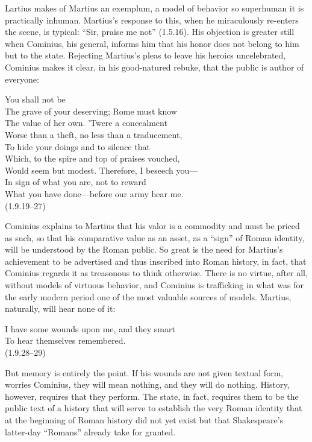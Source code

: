 Lartius makes of Martius an exemplum, a model of behavior so superhuman it is practically inhuman.
Martius's response to this, when he miraculously re-enters the scene, is typical: ``Sir, praise me not'' (1.5.16).
His objection is greater still when Cominius, his general, informs him that his honor does not belong to him but to the state.
Rejecting Martius's pleas to leave his heroics uncelebrated, Cominius makes it clear, in his good-natured rebuke, that the public is author of everyone:
\begin{vq}
You shall not be\\
The grave of your deserving; Rome must know\\
The value of her own. 'Twere a concealment\\
Worse than a theft, no less than a traducement,\\
To hide your doings and to silence that\\
Which, to the spire and top of praises vouched,\\
Would seem but modest. Therefore, I beseech you---\\
In sign of what you are, not to reward\\
What you have done---before our army hear me.\\
\hfill(1.9.19--27)
\end{vq}
Cominius explains to Martius that his valor is a commodity and must be priced as such, so that his comparative value as an asset, as a ``sign'' of Roman identity, will be understood by the Roman public.
So great is the need for Martius's achievement to be advertised and thus inscribed into Roman history, in fact, that Cominius regards it as treasonous to think otherwise.
There is no virtue, after all, without models of virtuous behavior, and Cominius is trafficking in what was for the early modern period one of the most valuable sources of models.
Martius, naturally, will hear none of it:
\begin{vq}
I have some wounds upon me, and they smart\\
To hear themselves remembered.\\
\hfill(1.9.28--29)
\end{vq}
But memory is entirely the point.
If his wounds are not given textual form, worries Cominius, they will mean nothing, and they will do nothing.
History, however, requires that they perform.
The state, in fact, requires them to be the public text of a history that will serve to establish the very Roman identity that at the beginning of Roman history did not yet exist but that Shakespeare's latter-day ``Romans'' already take for granted.
